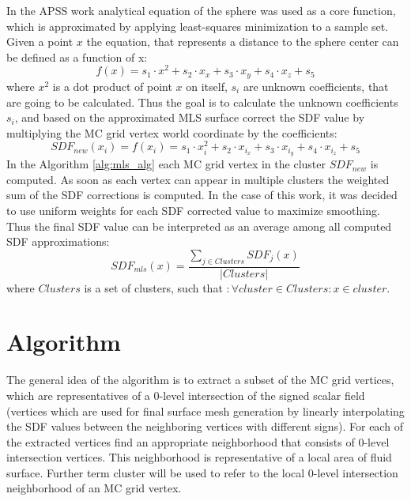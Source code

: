 In the APSS work analytical equation of the sphere was used as a core function, which is approximated by applying least-squares minimization to a sample set. Given a point $x$ the equation, that represents a distance to the sphere center can be defined as a function of x:
\begin{equation}
f(x) = s_1\cdot x^2 + s_2 \cdot x_x + s_3 \cdot x_y + s_4 \cdot x_z + s_5
\end{equation}
where $x^2$ is a dot product of point $x$ on itself, $s_i$ are unknown coefficients, that are going to be calculated. Thus the goal is to calculate the unknown coefficients $s_i$, and based on the approximated MLS surface correct the SDF value by multiplying the MC grid vertex world coordinate by the coefficients:
\begin{equation}
SDF_{new}(x_i) = f(x_i) = s_1\cdot x_i^2 + s_2 \cdot x_{i_x} + s_3 \cdot x_{i_y} + s_4 \cdot x_{i_z} + s_5 \label{eq:sdf_approximation}
\end{equation}
In the Algorithm \ref{alg:mls_alg} each MC grid vertex in the cluster $SDF_{new}$ is computed. As soon as each vertex can appear in multiple clusters the weighted sum of the SDF corrections is computed. In the case of this work, it was decided to use uniform weights for each SDF corrected value to maximize smoothing. Thus the final SDF value can be interpreted as an average among all computed SDF approximations:
\begin{equation}
	SDF_{mls}(x) = \dfrac{\sum_{j \in Clusters}{SDF_{j}(x)}}{|Clusters|} \label{eq:sdf_mls_approximation_final}
\end{equation}
where $Clusters$ is a set of clusters, such that $: \forall cluster \in Clusters: x \in cluster$. 

\section{Algorithm}
The general idea of the algorithm is to extract a subset of the MC grid vertices, which are representatives of a 0-level intersection of the signed scalar field (vertices which are used for final surface mesh generation by linearly interpolating the SDF values between the neighboring vertices with different signs). For each of the extracted vertices find an appropriate neighborhood that consists of 0-level intersection vertices. This neighborhood is representative of a local area of fluid surface. Further term cluster will be used to refer to the local 0-level intersection neighborhood of an MC grid vertex.

